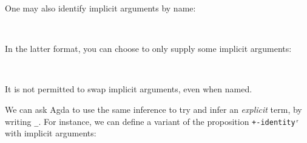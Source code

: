 One may also identify implicit arguments by name:

\begin{fence}
\begin{code}%
\>[0]\AgdaFunction{\AgdaUnderscore{}}\AgdaSpace{}%
\AgdaSymbol{:}\AgdaSpace{}%
\AgdaSpace{}%
\AgdaSpace{}%
\<%
\\
\>[0]\AgdaSymbol{\AgdaUnderscore{}}\AgdaSpace{}%
\AgdaSymbol{=}\AgdaSpace{}%
\AgdaSpace{}%
\AgdaSymbol{\{}\AgdaSpace{}%
\AgdaSymbol{=}\AgdaSpace{}%
\AgdaSymbol{\}}\AgdaSpace{}%
\AgdaSymbol{\{}\AgdaSpace{}%
\AgdaSymbol{=}\AgdaSpace{}%
\AgdaSymbol{\}}\AgdaSpace{}%
\AgdaSymbol{(}\AgdaSpace{}%
\AgdaSymbol{\{}\AgdaSpace{}%
\AgdaSymbol{=}\AgdaSpace{}%
\AgdaSymbol{\}}\AgdaSpace{}%
\AgdaSymbol{\{}\AgdaSpace{}%
\AgdaSymbol{=}\AgdaSpace{}%
\AgdaSymbol{\}}\AgdaSpace{}%
\AgdaSymbol{(}\AgdaSpace{}%
\AgdaSymbol{\{}\AgdaSpace{}%
\AgdaSymbol{=}\AgdaSpace{}%
\AgdaSymbol{\}))}\<%
\end{code}
\end{fence}

In the latter format, you can choose to only supply some implicit
arguments:

\begin{fence}
\begin{code}%
\>[0]\AgdaFunction{\AgdaUnderscore{}}\AgdaSpace{}%
\AgdaSymbol{:}\AgdaSpace{}%
\AgdaSpace{}%
\AgdaSpace{}%
\<%
\\
\>[0]\AgdaSymbol{\AgdaUnderscore{}}\AgdaSpace{}%
\AgdaSymbol{=}\AgdaSpace{}%
\AgdaSpace{}%
\AgdaSymbol{\{}\AgdaSpace{}%
\AgdaSymbol{=}\AgdaSpace{}%
\AgdaSymbol{\}}\AgdaSpace{}%
\AgdaSymbol{(}\AgdaSpace{}%
\AgdaSymbol{\{}\AgdaSpace{}%
\AgdaSymbol{=}\AgdaSpace{}%
\AgdaSymbol{\}}\AgdaSpace{}%
\AgdaSymbol{)}\<%
\end{code}
\end{fence}

It is not permitted to swap implicit arguments, even when named.

We can ask Agda to use the same inference to try and infer an
\emph{explicit} term, by writing \texttt{\_}. For instance, we can
define a variant of the proposition \texttt{+-identityʳ} with implicit
arguments:

